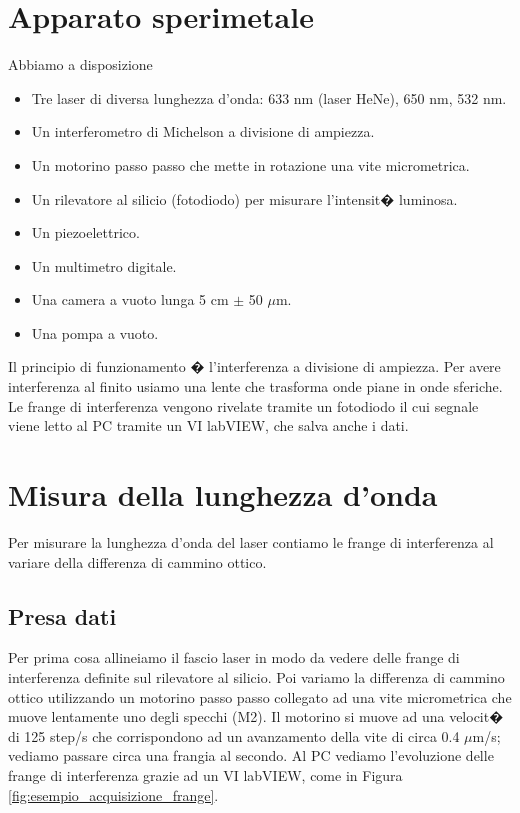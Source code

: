 \documentclass[a4paper]{article}
\begin{document}
\begin{multicols}{2}

\section{Apparato sperimetale}

	Abbiamo a disposizione 
	\begin{itemize}
		\item Tre laser di diversa lunghezza d'onda: 633 nm (laser HeNe), 650 nm, 532 nm.
		\item Un interferometro di Michelson a divisione di ampiezza.
		\item Un motorino passo passo che mette in rotazione una vite micrometrica.
		\item Un rilevatore al silicio (fotodiodo) per misurare l'intensit� luminosa.
		\item Un piezoelettrico.
		\item Un multimetro digitale.
		\item Una camera a vuoto lunga 5 cm $\pm$ 50 $\mu$m.
		\item Una pompa a vuoto.
	\end{itemize}
Il principio di funzionamento � l'interferenza a divisione di ampiezza. Per avere interferenza al finito usiamo una lente che trasforma onde piane in onde sferiche. Le frange di interferenza vengono rivelate tramite un fotodiodo il cui segnale viene letto al PC tramite un VI labVIEW, che salva anche i dati.

\section{Misura della lunghezza d'onda}
Per misurare la lunghezza d'onda del laser contiamo le frange di interferenza al variare della differenza di cammino ottico. 

\subsection{Presa dati}
Per prima cosa allineiamo il fascio laser in modo da vedere delle frange di interferenza definite sul rilevatore al silicio. 
Poi variamo la differenza di cammino ottico utilizzando un motorino passo passo collegato ad una vite micrometrica che muove lentamente uno degli specchi (M2). Il motorino si muove ad una velocit� di 125 step/s che corrispondono ad un avanzamento della vite di circa 0.4 $\mu$m/s; vediamo passare circa una frangia al secondo.
Al PC vediamo l'evoluzione delle frange di interferenza grazie ad un VI labVIEW, come in Figura \ref{fig:esempio_acquisizione_frange}.

\end{multicols}
\end{document}
